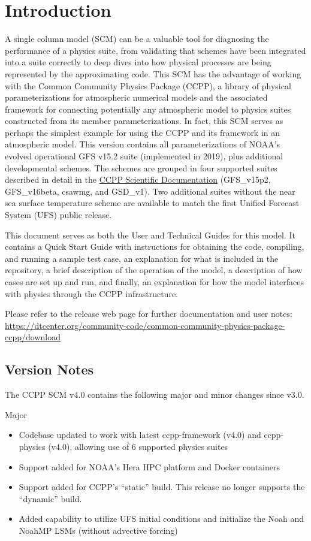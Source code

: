 \chapter{Introduction}
\label{chapter: introduction}

A single column model (SCM) can be a valuable tool for diagnosing the performance of a physics suite, from validating that schemes have been integrated into a suite correctly to deep dives into how physical processes are being represented by the approximating code. This SCM has the advantage of working with the Common Community Physics Package (CCPP), a library of physical parameterizations for atmospheric numerical models and the associated framework for connecting potentially any atmospheric model to physics suites constructed from its member parameterizations. In fact, this SCM serves as perhaps the simplest example for using the CCPP and its framework in an atmospheric model. This version contains all parameterizations of NOAA's evolved operational GFS v15.2 suite (implemented in 2019), plus additional developmental schemes. The schemes are grouped in four supported suites described in detail in the \href{https://dtcenter.org/GMTB/v4.0/sci\_doc/}{CCPP Scientific Documentation} (GFS\_v15p2, GFS\_v16beta, csawmg, and GSD\_v1). Two additional suites without the near sea surface temperature scheme are available to match the first Unified Forecast System (UFS) public release.

This document serves as both the User and Technical Guides for this model. It contains a Quick Start Guide with instructions for obtaining the code, compiling, and running a sample test case, an explanation for what is included in the repository, a brief description of the operation of the model, a description of how cases are set up and run, and finally, an explanation for how the model interfaces with physics through the CCPP infrastructure.

Please refer to the release web page for further documentation and user notes:\\ \url{https://dtcenter.org/community-code/common-community-physics-package-ccpp/download}

\section{Version Notes}

The CCPP SCM v4.0 contains the following major and minor changes since v3.0.

Major
\begin{itemize}
\item Codebase updated to work with latest ccpp-framework (v4.0) and ccpp-physics (v4.0), allowing use of 6 supported physics suites
\item Support added for NOAA's Hera HPC platform and Docker containers
\item Support added for CCPP's ``static'' build. This release no longer supports the ``dynamic'' build.
\item Added capability to utilize UFS initial conditions and initialize the Noah and NoahMP LSMs (without advective forcing)
\end{itemize}

